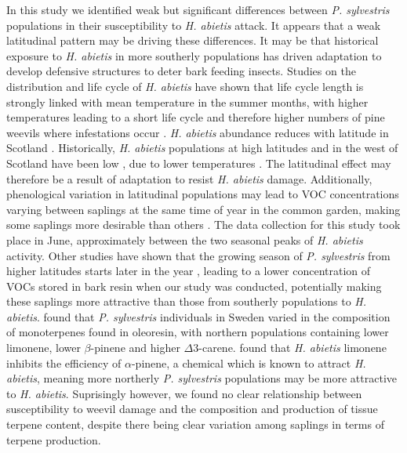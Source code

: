 \documentclass[a4paper, 11pt]{article}
\begin{document}
In this study we identified weak but significant differences between \textit{P. sylvestris} populations in their susceptibility to \textit{H. abietis} attack. It appears that a weak latitudinal pattern may be driving these differences. It may be that historical exposure to \textit{H. abietis} in more southerly populations has driven adaptation to develop defensive structures to deter bark feeding insects. Studies on the distribution and life cycle of \textit{H. abietis} have shown that life cycle length is strongly linked with mean temperature in the summer months, with higher temperatures leading to a short life cycle and therefore higher numbers of pine weevils where infestations occur \citep{Leather1999}. \textit{H. abietis} abundance reduces with latitude in Scotland \citep{Barredo2015}. Historically, \textit{H. abietis} populations at high latitudes and in the west of Scotland have been low \citep{Leather1999}, due to lower temperatures \citep{Wainhouse2014}. The latitudinal effect may therefore be a result of adaptation to resist \textit{H. abietis} damage. Additionally, phenological variation in latitudinal populations may lead to VOC concentrations varying between saplings at the same time of year in the common garden, making some saplings more desirable than others \citep{Guenther1997}. The data collection for this study took place in June, approximately between the two seasonal peaks of \textit{H. abietis} activity. Other studies have shown that the growing season of \textit{P. sylvestris} from higher latitudes starts later in the year \citep{Salmela2013}, leading to a lower concentration of VOCs stored in bark resin when our study was conducted, potentially making these saplings more attractive than those from southerly populations to \textit{H. abietis}. \citet{Yazdani1985} found that \textit{P. sylvestris} individuals in Sweden varied in the composition of monoterpenes found in oleoresin, with northern populations containing lower limonene, lower $\beta$-pinene and higher $\Delta$3-carene. \citet{Nordlander1990} found that \textit{H. abietis} limonene inhibits the efficiency of $\alpha$-pinene, a chemical which is known to attract \textit{H. abietis}, meaning more northerly \textit{P. sylvestris} populations may be more attractive to \textit{H. abietis}. Suprisingly however, we found no clear relationship between susceptibility to weevil damage and the composition and production of tissue terpene content, despite there being clear variation among saplings in terms of terpene production. 
\end{document}
